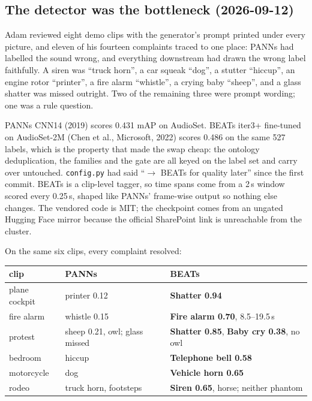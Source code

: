 \documentclass[11pt,a4paper]{article}
\begin{document}
\subsection{The detector was the bottleneck (2026-09-12)}\label{sec:beats}
Adam reviewed eight demo clips with the generator's prompt printed under every picture,
and eleven of his fourteen complaints traced to one place: PANNs had labelled the sound
wrong, and everything downstream had drawn the wrong label faithfully. A siren was
``truck horn'', a car squeak ``dog'', a stutter ``hiccup'', an engine rotor ``printer'', a
fire alarm ``whistle'', a crying baby ``sheep'', and a glass shatter was missed outright.
Two of the remaining three were prompt wording; one was a rule question.

PANNs CNN14 (2019) scores 0.431 mAP on AudioSet. BEATs iter3+ fine-tuned on AudioSet-2M
(Chen et al., Microsoft, 2022) scores 0.486 on the same 527 labels, which is the property
that made the swap cheap: the ontology deduplication, the families and the gate are all
keyed on the label set and carry over untouched. \texttt{config.py} had said
``$\rightarrow$ BEATs for quality later'' since the first commit. BEATs is a clip-level
tagger, so time spans come from a 2\,s window scored every 0.25\,s, shaped like PANNs'
frame-wise output so nothing else changes. The vendored code is MIT; the checkpoint comes
from an ungated Hugging Face mirror because the official SharePoint link is unreachable
from the cluster.

On the same six clips, every complaint resolved:

\begin{center}
\begin{tabular}{lll}
\toprule
clip & PANNs & BEATs \\
\midrule
plane cockpit & printer 0.12 & \textbf{Shatter 0.94} \\
fire alarm & whistle 0.15 & \textbf{Fire alarm 0.70}, 8.5--19.5\,s \\
protest & sheep 0.21, owl; glass missed & \textbf{Shatter 0.85}, \textbf{Baby cry 0.38}, no owl \\
bedroom & hiccup & \textbf{Telephone bell 0.58} \\
motorcycle & dog & \textbf{Vehicle horn 0.65} \\
rodeo & truck horn, footsteps & \textbf{Siren 0.65}, horse; neither phantom \\
\bottomrule
\end{tabular}
\end{center}
\end{document}
